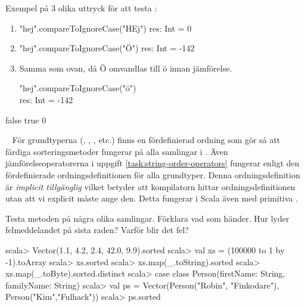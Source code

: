 \SubtaskSolved
Exempel på 3 olika uttryck för att testa :

\begin{enumerate}

\item
\begin{REPLnonum}
	"hej".compareToIgnoreCase("HEj")
	res: Int = 0
\end{REPLnonum}

\item
\begin{REPLnonum}
	"hej".compareToIgnoreCase("Ö")
	res: Int = -142
\end{REPLnonum}

\item
Samma som ovan, då Ö omvandlas till ö innan jämförelse.
 \begin{REPLnonum}
	"hej".compareToIgnoreCase("ö") \\ res: Int = -142
\end{REPLnonum}
\end{enumerate}

\SubtaskSolved
\begin{REPL}
false
true
0
\end{REPL}



\QUESTEND






\QUESTBEGIN

\Task  \what~  För grundtyperna (, , , etc.) finns en fördefinierad ordning som gör så att färdiga sorteringsmetoder fungerar på alla samlingar i . Även jämförelseoperatorerna i uppgift \ref{task:string-order-operators} fungerar enligt den fördefinierade ordningsdefinitionen för alla grundtyper. Denna ordningsdefinition är \textit{implicit tillgänglig} vilket betyder att kompilatorn hittar ordningsdefinitionen utan att vi explicit måste ange den. Detta fungerar i Scala även med primitiva .

\Subtask Testa metoden  på några olika samlingar. Förklara vad som händer. Hur lyder felmeddelandet på sista raden? Varför blir det fel?

\begin{REPL}
scala> Vector(1.1, 4.2, 2.4, 42.0, 9.9).sorted
scala> val xs = (100000 to 1 by -1).toArray
scala> xs.sorted
scala> xs.map(_.toString).sorted
scala> xs.map(_.toByte).sorted.distinct
scala> case class Person(firstName: String, familyName: String)
scala> val ps = Vector(Person("Robin", "Finkodare"), Person("Kim","Fulhack"))
scala> ps.sorted
\end{REPL}

